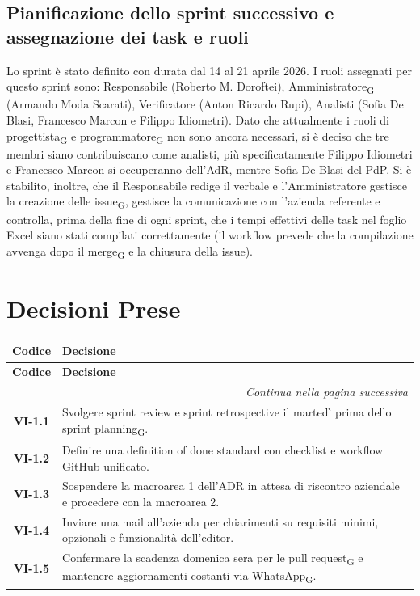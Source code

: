 \subsection{Pianificazione dello sprint successivo e assegnazione dei task e ruoli}
Lo sprint è stato definito con durata dal 
14 al 21 aprile 2026. I ruoli assegnati per questo sprint 
sono: Responsabile (Roberto M. Doroftei), 
Amministratore\textsubscript{G} (Armando Moda Scarati), Verificatore 
(Anton Ricardo Rupi), Analisti 
(Sofia De Blasi, Francesco Marcon e Filippo Idiometri). 
Dato che attualmente i ruoli di progettista\textsubscript{G} e programmatore\textsubscript{G} 
non sono ancora necessari, si è deciso che 
tre membri siano contribuiscano 
come analisti, più specificatamente 
Filippo Idiometri e Francesco Marcon si occuperanno 
dell'AdR, mentre Sofia De Blasi del PdP. 
Si è stabilito, inoltre, che il Responsabile 
redige il verbale e l'Amministratore gestisce 
la creazione delle issue\textsubscript{G}, gestisce la 
comunicazione con l'azienda referente e controlla, 
prima della fine di ogni sprint, che i tempi 
effettivi delle task nel foglio Excel siano stati 
compilati correttamente (il workflow prevede che la 
compilazione avvenga dopo il merge\textsubscript{G} e la chiusura della 
issue).
 

\section{Decisioni Prese}

\renewcommand{\arraystretch}{1.3}
\vspace{-0.3cm}
\noindent
\begin{longtable}{c p{12cm}}
	\toprule
	\textbf{Codice} & \textbf{Decisione} \\
	\midrule
	\endfirsthead

	\toprule
	\textbf{Codice} & \textbf{Decisione} \\
	\midrule
	\endhead

	\midrule
	\multicolumn{2}{r}{\textit{Continua nella pagina successiva}} \\
	\midrule
	\endfoot

	\bottomrule
	\endlastfoot

	\textbf{VI-1.1} & Svolgere sprint review e sprint retrospective il martedì prima dello sprint planning\textsubscript{G}. \\[4pt]
	\textbf{VI-1.2} & Definire una definition of done standard con checklist e workflow GitHub unificato. \\[4pt]
	\textbf{VI-1.3} & Sospendere la macroarea 1 dell'ADR in attesa di riscontro aziendale e procedere con la macroarea 2. \\[4pt]
	\textbf{VI-1.4} & Inviare una mail all’azienda per chiarimenti su requisiti minimi, opzionali e funzionalità dell’editor. \\[4pt]
	\textbf{VI-1.5} & Confermare la scadenza domenica sera per le pull request\textsubscript{G} e mantenere aggiornamenti costanti via WhatsApp\textsubscript{G}. \\
\end{longtable}

